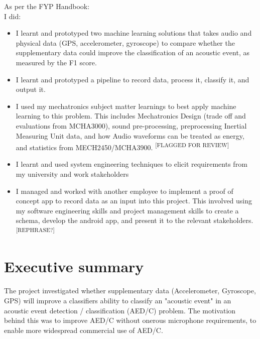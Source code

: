 \documentclass{UoNMCHA}
\newcommand{\flagforreview}{\textsuperscript{\color{red} [FLAGGED FOR REVIEW]}}
\newcommand{\rephrase}{\textsuperscript{\color{red} [REPHRASE?]}}
\numberwithin{equation}{section}
\begin{document}
As per the FYP Handbook: \\
I did:
\begin{itemize}
    \item I learnt and prototyped two machine learning solutions that takes audio and physical data (GPS, accelerometer, gyroscope) to compare whether the supplementary data could improve the classification of an acoustic event, as measured by the F1 score.
    \item I learnt and prototyped a pipeline to record data, process it, classify it, and output it.
    \item I used my mechatronics subject matter learnings to best apply machine learning to this problem. This includes Mechatronics Design (trade off and evaluations from MCHA3000), sound pre-processing, preprocessing Inertial Measuring Unit data, and how Audio waveforms can be treated as energy, and statistics from MECH2450/MCHA3900. \flagforreview
    \item I learnt and used system engineering techniques to elicit requirements from my university and work stakeholders
    \item I managed and worked with another employee to implement a proof of concept app to record data as an input into this project. This involved using my software engineering skills and project management skills to create a schema, develop the android app, and present it to the relevant stakeholders. \rephrase
\end{itemize}



\newpage

\vspace{-5mm}
\section*{Executive summary}
\vspace{-3mm}
The project investigated whether supplementary data (Accelerometer, Gyroscope, GPS) will improve a classifiers ability to classify an "acoustic event" in an acoustic event detection / classification (AED/C) problem. The motivation behind this was to improve AED/C without onerous microphone requirements, to enable more widespread commercial use of AED/C. \\
\end{document}
